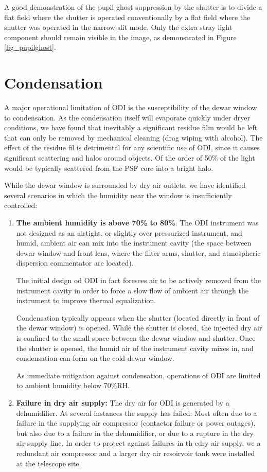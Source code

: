 \documentclass[]{spieman}
\begin{document}
A good demonstration of the pupil ghost suppression by the shutter is to divide
a flat field where the shutter is operated conventionally by a flat field where
the shutter was operated in the narrow-slit mode. Only the extra stray light
component should remain visible in the image, as demonstrated in Figure
\ref{fig_pupilghost}.


\section{Condensation}

A major operational limitation of ODI is the susceptibility of the dewar window
to condensation. As the condensation itself will evaporate quickly under dryer
conditions, we have found that inevitably a significant residue film would be
left that can only be removed by mechanical cleaning (drag wiping with alcohol).
The effect of the residue fil is detrimental for any scientific use of ODI,
since it causes significant scattering and halos around objects. Of the order of
50\%  of the light would be typically scattered from the PSF core into a bright
halo.

While the dewar window is surrounded by dry air outlets, we have identified
several scenarios in which the humidity near the window is insufficiently
controlled:

\begin{enumerate}
	\item {\bf The ambient humidity is above 70\% to 80\%}. The ODI instrument 
	was not designed as an airtight, or slightly over pressurized instrument, 
	and humid, ambient air can mix into the instrument cavity (the space 
	between dewar window and front lens, where the filter arms, shutter, and 
	atmospheric dispersion commentator are located).
	
	The initial design od ODI in fact foresees air to be actively removed from 
	the instrument cavity in order to force a slow flow of ambient air through 
	the instrument to improve thermal equalization. 
	
	Condensation typically appears when the shutter (located directly in front 
	of the dewar window) is opened. While the shutter is closed, the injected 
	dry air is confined to the small space between the dewar window and 
	shutter. Once the shutter is opened, the  humid air of the instrument 
	cavity mixes in, and condensation can form on the cold dewar window. 
	
	As immediate mitigation against condensation, operations of ODI are limited 
	to ambient humidity below 70\%RH.
	
	\item {\bf Failure in dry air supply:} The dry air for ODI is generated by 
	a dehumidifier. At several instances the supply has failed: Most often due 
	to a failure in the supplying air compressor (contactor failure or power 
	outages), but also due to a failure in the dehumidifier, or due to a 
	rupture in the dry air supply line. In order to protect against failures in 
	th edry air supply, we a redundant air compressor and a larger dry air 
	resoirvoir tank were installed at the telescope site. 

\end{enumerate}
\end{document}
